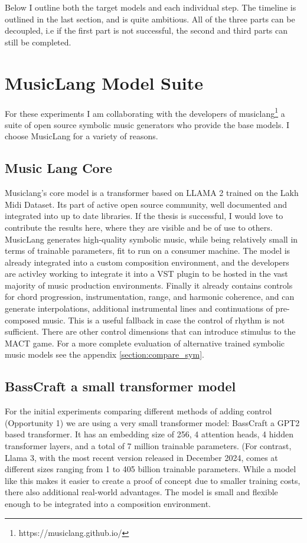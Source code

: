 Below I outline both the target models and each individual step. The timeline is outlined in the last section, and is quite ambitious. All of the three parts can be decoupled, i.e if the first part is not successful, the second and third parts can still be completed.  

\section{MusicLang Model Suite}
For these experiments I am collaborating with the developers of musiclang\footnote{https://musiclang.github.io/} a suite of open source symbolic music generators who provide the base models. I choose MusicLang for a variety of reasons. 

\subsection{Music Lang Core}
Musiclang's core model is a transformer based on LLAMA 2 trained on the Lakh Midi Dataset\cite{Raffel_2016}. Its part of active open source community, well documented and integrated into up to date libraries. If the thesis is successful, I would love to contribute the results here, where they are visible and be of use to others. MusicLang generates high-quality symbolic music, while being relatively small in terms of trainable parameters, fit to run on a consumer machine. The model is already integrated into a custom composition environment, and the developers are activley working to integrate it into a VST plugin to be hosted in the vast majority of music production environments.  
Finally it already contains controls for chord progression, instrumentation, range, and harmonic coherence, and can generate interpolations, additional instrumental lines and continuations of pre-composed music. This is a useful fallback in case the control of rhythm is not sufficient. There are other control dimensions that can introduce stimulus to the MACT game. For a more complete evaluation of alternative trained symbolic music models see the appendix \ref{section:compare_sym}. 

\subsection{BassCraft a small transformer model}

For the initial experiments comparing different methods of adding control (Opportunity 1) we are using a very small transformer model: BassCraft a GPT2 \cite{Radford_Wu_Child_Luan_gpt2_2019} based transformer. It has an embedding size of 256, 4 attention heads, 4 hidden transformer layers, and a total of 7 million trainable parameters.  (For contrast, Llama 3, with the most recent version released in December 2024,  comes at different sizes ranging from 1 to 405 billion trainable parameters.  While a model like this makes it easier to create a proof of concept due to smaller training costs, there also additional real-world advantages. The model is small and flexible enough to be integrated into a composition environment. 

